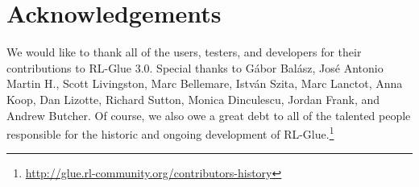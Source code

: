 \documentclass[twoside,11pt]{article}
\begin{document}



\section{Acknowledgements}
We would like to thank all of the users, testers, and developers for their contributions to RL-Glue 3.0. Special thanks to 
G\'{a}bor Bal\'{a}sz,  %
Jos\'{e} Antonio Martin H.,  %
Scott Livingston, %
Marc Bellemare, 
Istv\'{a}n Szita,  %
Marc Lanctot, 
Anna Koop, 
Dan Lizotte,
Richard Sutton,
Monica Dinculescu,
Jordan Frank, and
Andrew Butcher.  Of course, we also owe a great debt to all of the talented people responsible for the historic and ongoing development of RL-Glue.\footnote{\url{http://glue.rl-community.org/contributors-history}}

%
%




\end{document}

